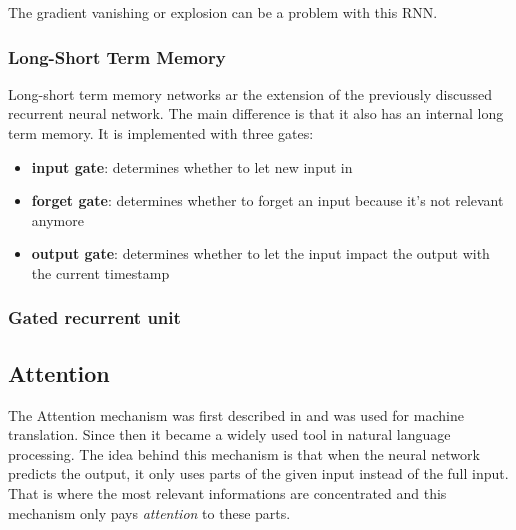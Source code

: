 The gradient vanishing or explosion can be a problem with this RNN.
\subsubsection{Long-Short Term Memory}
Long-short term memory networks ar the extension of the previously discussed recurrent neural network. The main difference is that it also has an internal long term memory. It is implemented with three gates:
\begin{itemize}
	\item \textbf{input gate}: determines whether to let new input in
	\item \textbf{forget gate}: determines whether to forget an input because it's not relevant anymore
	\item \textbf{output gate}: determines whether to let the input impact the output with the current timestamp
\end{itemize}
\subsubsection{Gated recurrent unit}
\subsection{Attention}
The Attention mechanism was first described in \cite{Bahdanau:2015} and was used for machine translation. Since then it became a widely used tool in natural language processing. The idea behind this mechanism is that when the neural network predicts the output, it only uses parts of the given input instead of the full input. That is where the most relevant informations are concentrated and this mechanism only pays \textit{attention} to these parts.